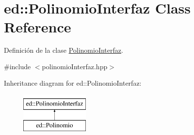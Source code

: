 \hypertarget{classed_1_1PolinomioInterfaz}{\section{ed\-:\-:Polinomio\-Interfaz Class Reference}
\label{classed_1_1PolinomioInterfaz}
}


Definición de la clase \hyperlink{classed_1_1PolinomioInterfaz}{Polinomio\-Interfaz}.  




{\ttfamily \#include $<$polinomio\-Interfaz.\-hpp$>$}

Inheritance diagram for ed\-:\-:Polinomio\-Interfaz\-:\begin{figure}[H]
\begin{center}
\leavevmode
\includegraphics[height=2.000000cm]{classed_1_1PolinomioInterfaz}
\end{center}
\end{figure}
